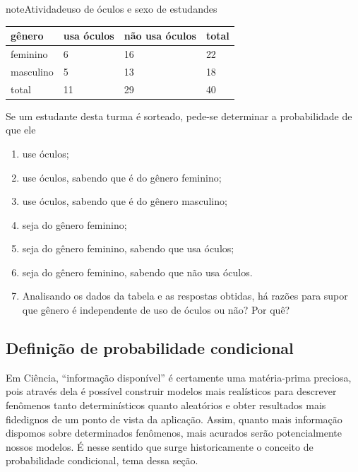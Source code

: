\begin{sphinxadmonition}{note}{Atividade}{uso de óculos e sexo de estudandes}
\begin{savenotes}
\begin{tabulary}{\linewidth}[t]{|T|T|T|T|}
gênero
&
usa óculos
&
não usa óculos
&
total
\\
\hline
feminino
&
6
&
16
&
22
\\
\hline
masculino
&
5
&
13
&
18
\\
\hline
total
&
11
&
29
&
40
\\
\hline
\end{tabulary}
\par
\sphinxattableend\end{savenotes}

Se um estudante desta turma é sorteado, pede-se determinar a probabilidade de que ele
\begin{enumerate}
\item {} 
use óculos;

\item {} 
use óculos, sabendo que é do gênero feminino;

\item {} 
use óculos, sabendo que é do gênero masculino;

\item {} 
seja do gênero feminino;

\item {} 
seja do gênero feminino, sabendo que usa óculos;

\item {} 
seja do gênero feminino, sabendo que não usa óculos.

\item {} 
Analisando os dados da tabela e as respostas obtidas, há razões para supor que gênero é independente de uso de óculos ou não? Por quê?

\end{enumerate}
\end{sphinxadmonition}


\label{\detokenize{PE511-7:organizando-probabilidade-condicional}}\label{\detokenize{PE511-7::doc}}

\subsection{Definição de probabilidade condicional}
\label{\detokenize{PE511-7:sub-coloque-aqui-o-nome}}\label{\detokenize{PE511-7:definicao-de-probabilidade-condicional}}
Em Ciência,  “informação disponível”  é certamente uma matéria-prima preciosa, pois através dela é possível construir modelos mais realísticos para descrever  fenômenos tanto determinísticos quanto aleatórios e obter resultados mais fidedignos de um ponto de vista da aplicação. Assim, quanto mais informação dispomos sobre determinados fenômenos, mais acurados serão potencialmente nossos modelos. É nesse sentido que surge historicamente o conceito de probabilidade condicional, tema dessa seção.

